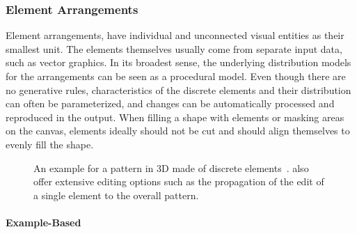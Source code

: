 \subsubsection{Element Arrangements}
\label{subsubsec:analysis_element_arrangements}

Element arrangements,  have individual and unconnected visual entities as their smallest unit. The elements themselves usually come from separate input data, such as vector graphics. In its broadest sense, the underlying distribution models for the arrangements can be seen as a procedural model. Even though there are no generative rules, characteristics of the discrete elements and their distribution can often be parameterized, and changes can be automatically processed and reproduced in the output. When filling a shape with elements or masking areas on the canvas, elements ideally should not be cut and should align themselves to evenly fill the shape.

\begin{figure}[b]
    \centering
    \caption{\label{fig:ma_2011_det}An example for a pattern in 3D made of discrete elements~\cite{ma_2011_det}. \citeauthor*{ma_2011_det} also offer extensive editing options such as the propagation of the edit of a single element to the overall pattern.}
\end{figure}

\paragraph*{Example-Based}
\label{para:analysis_element_arrangements_example}


